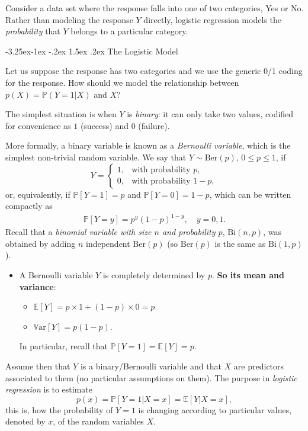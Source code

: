 \documentclass[]{book}
\makeatletter
\providecommand{\tightlist}{%
  \setlength{\itemsep}{0pt}\setlength{\parskip}{0pt}}
\newenvironment{rmdblock}[1]
  {\begin{shaded*}
  \begin{itemize}
  \renewcommand{\labelitemi}{
    \raisebox{-.7\height}[0pt][0pt]{
      {\setkeys{Gin}{width=2em,keepaspectratio}\texttt{[image: img/icons/\#1]}}
    }
  }
  \item
  }
  {
  \end{itemize}
  \end{shaded*}
  }
\newenvironment{rmdinsight}
  {\begin{rmdblock}{insight}}
  {\end{rmdblock}}
\renewcommand\subsection{\@startsection{subsection}{2}{\z@}%
                                     {-3.25ex\@plus -1ex \@minus -.2ex}%
                                     {1.5ex \@plus .2ex}%
                                     {\normalfont\large\bfseries\color{Violet}}}
\theoremstyle{definition}
\theoremstyle{definition}
\theoremstyle{definition}
\theoremstyle{remark}
\makeatother
\begin{document}
Consider a data set where the response falls into one of two categories,
Yes or No. Rather than modeling the response \(Y\) directly, logistic
regression models the \emph{probability} that \(Y\) belongs to a
particular category.

\subsection{The Logistic Model}\label{the-logistic-model}

Let us suppose the response has two categories and we use the generic
0/1 coding for the response. How should we model the relationship
between \(p(X) = \mathbb{P}(Y = 1|X)\) and \(X\)?

The simplest situation is when \(Y\) is \emph{binary}: it can only take
two values, codified for convenience as \(1\) (success) and \(0\)
(failure).

More formally, a binary variable is known as a \emph{Bernoulli
variable}, which is the simplest non-trivial random variable. We say
that \(Y\sim\mathrm{Ber}(p)\), \(0\leq p\leq1\), if \[
Y=\left\{\begin{array}{ll}1,&\text{with probability }p,\\0,&\text{with probability }1-p,\end{array}\right.
\] or, equivalently, if \(\mathbb{P}[Y=1]=p\) and
\(\mathbb{P}[Y=0]=1-p\), which can be written compactly as
\[\begin{aligned}
\mathbb{P}[Y=y]=p^y(1-p)^{1-y},\quad y=0,1.
\end{aligned}\] Recall that a \emph{binomial variable with size \(n\)
and probability \(p\)}, \(\mathrm{Bi}(n,p)\), was obtained by adding
\(n\) independent \(\mathrm{Ber}(p)\) (so \(\mathrm{Ber}(p)\) is the
same as \(\mathrm{Bi}(1,p)\)).

\begin{rmdinsight}
A Bernoulli variable \(Y\) is completely determined by \(p\). \textbf{So
its mean and variance}:

\begin{itemize}
\tightlist
\item
  \(\mathbb{E}[Y]=p\times1+(1-p)\times0=p\)
\item
  \(\mathbb{V}\mathrm{ar}[Y]=p(1-p)\).
\end{itemize}

In particular, recall that \(\mathbb{P}[Y=1]=\mathbb{E}[Y]=p\).
\end{rmdinsight}

Assume then that \(Y\) is a binary/Bernoulli variable and that \(X\) are
predictors associated to them (no particular assumptions on them). The
purpose in \emph{logistic regression} is to estimate \[
p(x)=\mathbb{P}[Y=1|X=x]=\mathbb{E}[Y|X=x],
\] this is, how the probability of \(Y=1\) is changing according to
particular values, denoted by \(x\), of the random variables \(X\).
\end{document}

